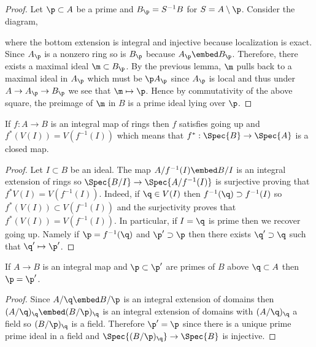 \documentclass[12pt]{article}
\begin{document}
\begin{proof}
Let $\p \subset A$ be a prime and $B_\p = S^{-1} B$ for $S = A \setminus \p$. Consider the diagram,
\begin{center}
\end{center}
where the bottom extension is integral and injective because localization is exact. Since $A_\p$ is a nonzero ring so is $B_\p$ because $A_\p \embed B_\p$. Therefore, there exists a maximal ideal $\m \subset B_\p$. By the previous lemma, $\m$ pulls back to a maximal ideal in $A_\p$ which must be $\p A_\p$ since $A_\p$ is local and thus under $A \to A_\p \to B_\p$ we see that $\m \mapsto \p$. Hence by commutativity of the above square, the preimage of $\m$ in $B$ is a prime ideal lying over $\p$.
\end{proof}

\begin{cor}[Going Up]
If $f : A \to B$ is an integral map of rings then $f$ satisfies going up and $f^*(V(I)) = V(f^{-1}(I))$ which means that $f^* : \Spec{B} \to \Spec{A}$ is a closed map.
\end{cor}

\begin{proof}
Let $I \subset B$ be an ideal. The map $A / f^{-1}(I) \embed B / I$ is an integral extension of rings so $\Spec{B/I} \to \Spec{A / f^{-1}(I)}$ is surjective proving that $f^* V(I) = V(f^{-1}(I))$. Indeed, if $\q \in V(I)$ then $f^{-1}(\q) \supset f^{-1}(I)$ so $f^*(V(I)) \subset V(f^{-1}(I))$ and the surjectivity proves that $f^*(V(I)) = V(f^{-1}(I))$. In particular, if $I = \q$ is prime then we recover going up. Namely if $\p = f^{-1}(\q)$ and $\p' \supset \p$ then there exists $\q' \supset \q$ such that $\q' \mapsto \p'$. 
\end{proof}

\begin{prop}[Incomparablility]
If $A \to B$ is an integral map and $\p \subset \p'$ are primes of $B$ above $\q \subset A$ then $\p = \p'$.
\end{prop}

\begin{proof}
Since $A / \q \embed B / \p$ is an integral extension of domains then $(A/\q)_\q \embed (B / \p)_\q$ is an integral extension of domains with $(A / \q)_\q$ a field so $(B / \p)_\q$ is a field. Therefore $\p' = \p$ since there is a unique prime prime ideal in a field and $\Spec{(B/\p)_\q} \to \Spec{B}$ is injective.
\end{proof}
\end{document}
